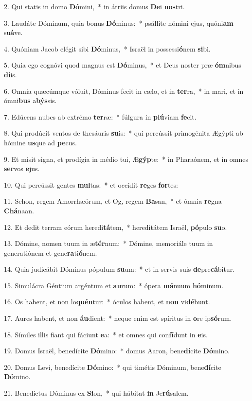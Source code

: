 2. Qui statis in domo \textbf{Dó}mini,~*  in átriis domus \textbf{De}i \textbf{nos}tri.\

3. Laudáte Dóminum, quia bonus \textbf{Dó}minus:~*  psállite nómini ejus, quóni\textbf{am} su\textbf{á}ve.\

4. Quóniam Jacob elégit sibi \textbf{Dó}minus,~*  Israël in possessi\textbf{ó}nem \textbf{si}bi.\

5. Quia ego cognóvi quod magnus est \textbf{Dó}minus,~*  et Deus noster præ \textbf{óm}nibus \textbf{di}is.\

6. Omnia quæcúmque vóluit, Dóminus fecit in cælo, et in \textbf{ter}ra,~*  in mari, et in ómni\textbf{bus} a\textbf{býs}sis.\

7. Edúcens nubes ab extrémo \textbf{ter}ræ:~*  fúlgura in \textbf{plú}viam \textbf{fe}cit.\

8. Qui prodúcit ventos de thesáuris \textbf{su}is:~*  qui percússit primogénita Ægýpti ab hómine \textbf{us}que ad \textbf{pe}cus.\

9. Et misit signa, et prodígia in médio tui, Æ\textbf{gýp}te:~*  in Pharaónem, et in omnes \textbf{ser}vos \textbf{e}jus.\

10. Qui percússit gentes \textbf{mul}tas:~*  et occídit \textbf{re}ges \textbf{for}tes:\

11. Sehon, regem Amorrhæórum, et Og, regem \textbf{Ba}san,~*  et ómnia \textbf{re}gna \textbf{Chá}naan.\

12. Et dedit terram eórum heredi\textbf{tá}tem,~*  hereditátem Israël, \textbf{pó}pulo \textbf{su}o.\

13. Dómine, nomen tuum in æ\textbf{tér}num:~*  Dómine, memoriále tuum in generatiónem et gene\textbf{ra}ti\textbf{ó}nem.\

14. Quia judicábit Dóminus pópulum \textbf{su}um:~*  et in servis suis \textbf{de}pre\textbf{cá}bitur.\

15. Simulácra Géntium argéntum et \textbf{au}rum:~*  ópera \textbf{má}nuum \textbf{hó}minum.\

16. Os habent, et non lo\textbf{quén}tur:~*  óculos habent, et \textbf{non} vi\textbf{dé}bunt.\

17. Aures habent, et non \textbf{áu}dient:~*  neque enim est spíritus in \textbf{o}re ip\textbf{só}rum.\

18. Símiles illis fiant qui fáciunt \textbf{e}a:~*  et omnes qui con\textbf{fí}dunt in \textbf{e}is.\

19. Domus Israël, benedícite \textbf{Dó}mino:~*  domus Aaron, bene\textbf{dí}cite \textbf{Dó}mino.\

20. Domus Levi, benedícite \textbf{Dó}mino:~*  qui timétis Dóminum, bene\textbf{dí}cite \textbf{Dó}mino.\

21. Benedíctus Dóminus ex \textbf{Si}on,~*  qui hábitat \textbf{in} Je\textbf{rú}salem.\

